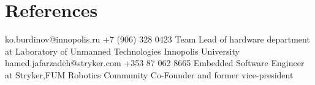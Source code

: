 \newpage
\section{References}
    \vspace{3mm}
    {ko.burdinov@innopolis.ru
    \hspace{7mm} +7 (906) 328 0423 }
    {Team Lead of hardware department at Laboratory of Unmanned Technologies
    Innopolis University
    }
    \vspace{3mm}
    {hamed.jafarzadeh@stryker.com 
    \hspace{7mm} +353 87 062 8665}
    {Embedded Software Engineer at Stryker,FUM Robotics Community Co-Founder and former vice-president }
    \vspace{3mm}
